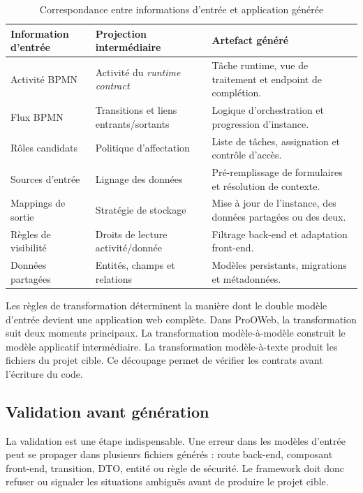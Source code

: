 \begin{table}[H]
\centering
\small
\caption{Correspondance entre informations d'entrée et application générée}
\label{tab:chap3-correspondance-entree-generation}
\begin{tabular}{p{3.6cm}p{4.5cm}p{5.6cm}}
\hline
\textbf{Information d'entrée} & \textbf{Projection intermédiaire} & \textbf{Artefact généré} \\
\hline
Activité BPMN & Activité du \textit{runtime contract} & Tâche runtime, vue de traitement et endpoint de complétion. \\
Flux BPMN & Transitions et liens entrants/sortants & Logique d'orchestration et progression d'instance. \\
Rôles candidats & Politique d'affectation & Liste de tâches, assignation et contrôle d'accès. \\
Sources d'entrée & Lignage des données & Pré-remplissage de formulaires et résolution de contexte. \\
Mappings de sortie & Stratégie de stockage & Mise à jour de l'instance, des données partagées ou des deux. \\
Règles de visibilité & Droits de lecture activité/donnée & Filtrage back-end et adaptation front-end. \\
Données partagées & Entités, champs et relations & Modèles persistants, migrations et métadonnées. \\
\hline
\end{tabular}
\end{table}

\label{sec:chap3-transformations}

Les règles de transformation déterminent la manière dont le double modèle d'entrée devient une application web complète. Dans ProOWeb, la transformation suit deux moments principaux. La transformation modèle-à-modèle construit le modèle applicatif intermédiaire. La transformation modèle-à-texte produit les fichiers du projet cible. Ce découpage permet de vérifier les contrats avant l'écriture du code.

\subsection{Validation avant génération}

La validation est une étape indispensable. Une erreur dans les modèles d'entrée peut se propager dans plusieurs fichiers générés : route back-end, composant front-end, transition, DTO, entité ou règle de sécurité. Le framework doit donc refuser ou signaler les situations ambiguës avant de produire le projet cible.

